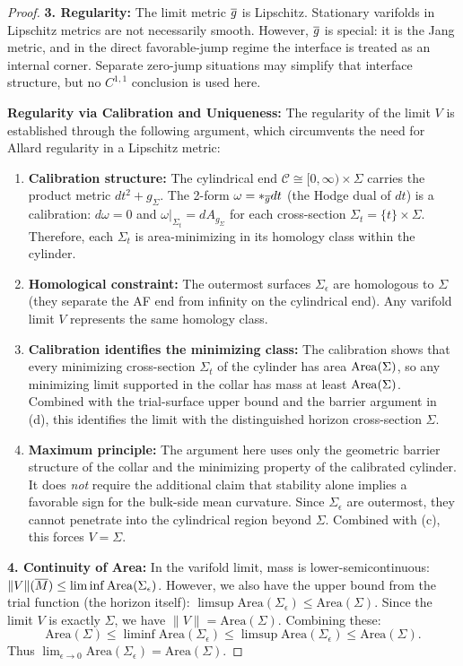 \begin{proof}
\textbf{3. Regularity:} The limit metric $\overline{g}$ is Lipschitz. Stationary varifolds in Lipschitz metrics are not necessarily smooth. However, $\overline{g}$ is special: it is the Jang metric, and in the direct favorable-jump regime the interface is treated as an internal corner. Separate zero-jump situations may simplify that interface structure, but no $C^{1,1}$ conclusion is used here.

\textbf{Regularity via Calibration and Uniqueness:} The regularity of the limit $V$ is established through the following argument, which circumvents the need for Allard regularity in a Lipschitz metric:
\begin{enumerate}
    \item[(a)] \textbf{Calibration structure:} The cylindrical end $\mathcal{C} \cong [0,\infty) \times \Sigma$ carries the product metric $dt^2 + g_\Sigma$. The 2-form $\omega = \ast_{\overline{g}} dt$ (the Hodge dual of $dt$) is a calibration: $d\omega = 0$ and $\omega|_{\Sigma_t} = dA_{g_\Sigma}$ for each cross-section $\Sigma_t = \{t\} \times \Sigma$. Therefore, each $\Sigma_t$ is area-minimizing in its homology class within the cylinder.

    \item[(b)] \textbf{Homological constraint:} The outermost surfaces $\Sigma_\epsilon$ are homologous to $\Sigma$ (they separate the AF end from infinity on the cylindrical end). Any varifold limit $V$ represents the same homology class.

    \item[(c)] \textbf{Calibration identifies the minimizing class:} The calibration shows that every minimizing cross-section $\Sigma_t$ of the cylinder has area $\operatorname{Area}(\Sigma)$, so any minimizing limit supported in the collar has mass at least $\operatorname{Area}(\Sigma)$. Combined with the trial-surface upper bound and the barrier argument in (d), this identifies the limit with the distinguished horizon cross-section $\Sigma$.

    \item[(d)] \textbf{Maximum principle:} The argument here uses only the geometric barrier structure of the collar and the minimizing property of the calibrated cylinder. It does \emph{not} require the additional claim that stability alone implies a favorable sign for the bulk-side mean curvature. Since $\Sigma_\epsilon$ are outermost, they cannot penetrate into the cylindrical region beyond $\Sigma$. Combined with (c), this forces $V = \Sigma$.
\end{enumerate}

\textbf{4. Continuity of Area:}
In the varifold limit, mass is lower-semicontinuous: $\|V\|(\overline{M}) \le \liminf \mathrm{Area}(\Sigma_\epsilon)$.
However, we also have the upper bound from the trial function (the horizon itself): $\limsup \mathrm{Area}(\Sigma_\epsilon) \le \mathrm{Area}(\Sigma)$.
Since the limit $V$ is exactly $\Sigma$, we have $\|V\| = \mathrm{Area}(\Sigma)$.
Combining these:
\[ \mathrm{Area}(\Sigma) \le \liminf \mathrm{Area}(\Sigma_\epsilon) \le \limsup \mathrm{Area}(\Sigma_\epsilon) \le \mathrm{Area}(\Sigma). \]
Thus $\lim_{\epsilon \to 0} \mathrm{Area}(\Sigma_\epsilon) = \mathrm{Area}(\Sigma)$.
\end{proof}
